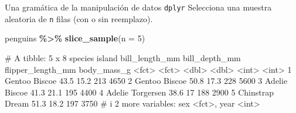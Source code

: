 \documentclass[
  ignorenonframetext,
  aspectratio=169]{beamer}
\newenvironment{Shaded}{\begin{snugshade}}{\end{snugshade}}
\newcommand{\AttributeTok}[1]{\textcolor[rgb]{0.13,0.29,0.53}{#1}}
\newcommand{\DecValTok}[1]{\textcolor[rgb]{0.00,0.00,0.81}{#1}}
\newcommand{\FunctionTok}[1]{\textcolor[rgb]{0.13,0.29,0.53}{\textbf{#1}}}
\newcommand{\NormalTok}[1]{#1}
\newcommand{\SpecialCharTok}[1]{\textcolor[rgb]{0.81,0.36,0.00}{\textbf{#1}}}
\let\oldverbatim\verbatim
\let\endoldverbatim\endverbatim
\renewenvironment{verbatim}{\tiny\oldverbatim}{\endoldverbatim}
\begin{document}
\begin{frame}[fragile]{Una gramática de la manipulación de datos
\texttt{dplyr}}
\label{una-gramuxe1tica-de-la-manipulaciuxf3n-de-datos-dplyr-2}
Selecciona una muestra aleatoria de \texttt{n} filas (con o sin
reemplazo).

\begin{Shaded}
\begin{Highlighting}[]
\NormalTok{penguins }\SpecialCharTok{\%\textgreater{}\%} 
  \FunctionTok{slice\_sample}\NormalTok{(}\AttributeTok{n =} \DecValTok{5}\NormalTok{)}
\end{Highlighting}
\end{Shaded}

\begin{verbatim}
# A tibble: 5 x 8
  species   island    bill_length_mm bill_depth_mm flipper_length_mm body_mass_g
  <fct>     <fct>              <dbl>         <dbl>             <int>       <int>
1 Gentoo    Biscoe              43.5          15.2               213        4650
2 Gentoo    Biscoe              50.8          17.3               228        5600
3 Adelie    Biscoe              41.3          21.1               195        4400
4 Adelie    Torgersen           38.6          17                 188        2900
5 Chinstrap Dream               51.3          18.2               197        3750
# i 2 more variables: sex <fct>, year <int>
\end{verbatim}
\end{frame}
\end{document}
